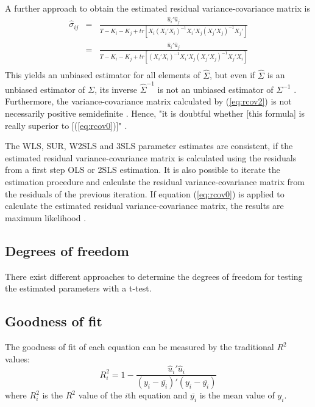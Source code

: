 A further approach to obtain the estimated residual variance-covariance
matrix is \citep[p. 309]{zellner62c}
\begin{eqnarray}
   \widehat{\sigma}_{ij} & = & 
   \frac{ \widehat{u}_i' \widehat{u}_j } 
   { T - K_i - K_j + tr \left[ X_i \left( X_i' X_i \right)^{-1}
   X_i' X_j \left( X_j' X_j \right)^{-1} X_j' \right] } \\
   & = &
   \frac{ \widehat{u}_i' \widehat{u}_j } 
   { T - K_i - K_j + tr \left[ \left( X_i' X_i \right)^{-1}
   X_i' X_j \left( X_j' X_j \right)^{-1} X_j' X_i \right] } \\
   \label{eq:rcov2}
\end{eqnarray} 
This yields an unbiased estimator for all elements of $\widehat{\Sigma}$,
but even if $\widehat{\Sigma}$ is an unbiased estimator of $\Sigma$, 
its inverse $\widehat{\Sigma}^{-1}$ is not an unbiased estimator 
of $\Sigma^{-1}$ \citep[p.322]{theil71}.
Furthermore, the variance-covariance matrix calculated by (\ref{eq:rcov2})
is not necessarily positive semidefinite \citep[p.322]{theil71}. 
Hence, "it is doubtful whether [this formula] is really superior to 
[(\ref{eq:rcov0})]" \citep[p.322]{theil71}.


The WLS, SUR, W2SLS and 3SLS parameter estimates are consistent,
if the estimated residual variance-covariance matrix is calculated
using the residuals from a first step OLS or 2SLS estimation.
It is also possible to iterate the estimation procedure and 
calculate the residual variance-covariance matrix from the
residuals of the previous iteration. 
If equation (\ref{eq:rcov0}) is applied to calculate the estimated
residual variance-covariance matrix, the results are maximum
likelihood \citep[p. 345]{greene02}.


\subsection{Degrees of freedom}

There exist different approaches to determine the degrees of
freedom for testing the estimated parameters with a t-test.


\subsection{Goodness of fit}

The goodness of fit of each equation can be measured by the 
traditional $R^2$ values:
\begin{equation}
   R_i^2 = 1 - \frac{ \widehat{u}_i' \widehat{u}_i }
   { ( y_i - \overline{y_i} )' ( y_i - \overline{y_i} ) }
\end{equation}
where $R_i^2$ is the $R^2$ value of the $i$th equation
and $\overline{y_i}$ is the mean value of $y_i$.

